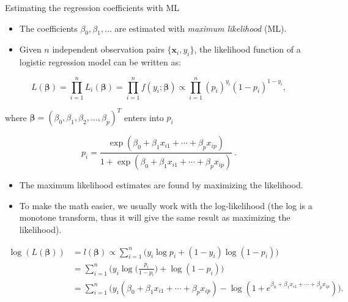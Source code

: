 \documentclass[
  10pt,
  ignorenonframetext,
]{beamer}
\providecommand{\tightlist}{%
  \setlength{\itemsep}{0pt}\setlength{\parskip}{0pt}}
\begin{document}
\begin{frame}
\begin{block}{Estimating the regression coefficients with ML}
\protect\hypertarget{estimating-the-regression-coefficients-with-ml}{}
\(~\)

\begin{itemize}
\tightlist
\item
  The coefficients \(\beta_0, \beta_1, \ldots\) are estimated with
  \emph{maximum likelihood} (ML).
\end{itemize}

\vspace{2mm}

\begin{itemize}
\tightlist
\item
  Given \(n\) independent observation pairs
  \(\{{\boldsymbol x}_i, y_i\}\), the likelihood function of a logistic
  regression model can be written as:
\end{itemize}

\[L(\boldsymbol{\beta}) = \prod_{i=1}^n L_i(\boldsymbol{\beta}) = \prod_{i=1}^n f(y_i; \boldsymbol{\beta}) \propto \prod_{i=1}^n (p_i)^{y_i}(1-p_i)^{1-y_i},\]

where
\(\boldsymbol{\beta} = (\beta_0, \beta_1, \beta_2, \ldots, \beta_p)^T\)
enters into \(p_i\)

\[p_i= \frac{\exp(\beta_0+\beta_1 x_{i1}+\cdots + \beta_p x_{ip})}{1 + \exp(\beta_0 + \beta_1 x_{i1}+\cdots+\beta_p x_{ip})} \ .\]
\end{block}
\end{frame}

\begin{frame}
\begin{itemize}
\item
  The maximum likelihood estimates are found by maximizing the
  likelihood.
\item
  To make the math easier, we usually work with the log-likelihood (the
  log is a monotone transform, thus it will give the same result as
  maximizing the likelihood).
\end{itemize}

\vspace{-4mm}

\begin{align*} \log(L(\boldsymbol{\beta}))&=l(\boldsymbol{\beta}) \propto \sum_{i=1}^n \Big ( y_i \log p_i + (1-y_i) \log(1 - p_i )\Big ) \\ &= \sum_{i=1}^n \Big ( y_i \log \Big (\frac{p_i}{1-p_i} \Big) + \log(1-p_i) \Big ) \\
&= \sum_{i=1}^n \Big (y_i (\beta_0 + \beta_1 x_{i1}+\cdots + \beta_p x_{ip}) - \log(1 + e^{\beta_0 + \beta_1 x_{i1}+\cdots + \beta_p x_{ip}} ) \Big ).\end{align*}
\end{frame}
\end{document}
